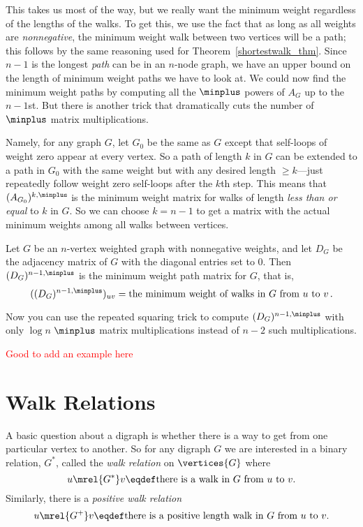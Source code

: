 \begin{editingnotes}
This takes us most of the way, but we really want the minimum weight
regardless of the lengths of the walks.  To get this, we use the fact that
as long as all weights are \emph{nonnegative}, the minimum weight walk
between two vertices will be a path; this follows by the same reasoning
used for Theorem~\ref{shortestwalk_thm}.  Since $n-1$ is the longest \emph{path}
can be in an $n$-node graph, we have an upper bound on the length of
minimum weight paths we have to look at.  We could now find the minimum
weight paths by computing all the $\minplus$ powers of $A_G$ up to the
$n-1$st.  But there is another trick that dramatically cuts the number of
$\minplus$ matrix multiplications.

Namely, for any graph $G$, let $G_0$ be the same as $G$ except that
self-loops of weight zero appear at every vertex.  So a path of length $k$
in $G$ can be extended to a path in $G_0$ with the same weight but with
any desired length $ \geq k$---just repeatedly follow weight zero
self-loops after the $k$th step.  This means that $(A_{G_0})^{k, \minplus}$
is the minimum weight matrix for walks of length \emph{less than or equal}
to $k$ in $G$.  So we can choose $k = n-1$ to get a matrix with the
actual minimum weights among all walks between vertices.

\begin{theorem}\label{thm:minweightmatrix}
Let $G$ be an $n$-vertex weighted graph with nonnegative weights, and let
$D_G$ be the adjacency matrix of $G$ with the diagonal entries set to 0.
Then $(D_G)^{n-1, \minplus}$ is the minimum weight path matrix for $G$, that
is,
\[
((D_G)^{n-1, \minplus})_{uv} = \text{the minimum weight of walks in $G$ from
 $u$ to $v$}\,.
\]
\end{theorem}
Now you can use the repeated squaring trick to compute $(D_G)^{n-1,
  \minplus}$ with only $\log n$ $\minplus$ matrix multiplications
instead of $n-2$ such multiplications.

\textcolor{red}{Good to add an example here}
\end{editingnotes}

\section{Walk Relations}\label{walk_relation_sec}
A basic question about a digraph is whether there is a way to get from one
particular vertex to another.  So for any digraph $G$ we are
interested in a binary relation, $G^*$, called the \emph{walk
  relation}%
 on $\vertices{G}$ where
\begin{equation}\label{G*def}
u \mrel{G^*} v \eqdef \mbox{there is a walk in $G$ from $u$ to $v$}.
\end{equation}
Similarly, there is a \emph{positive walk relation}
\begin{equation}\label{G+def}
u \mrel{G^+} v \eqdef \mbox{there is a positive length walk in $G$ from 
$u$ to $v$}.
\end{equation}

